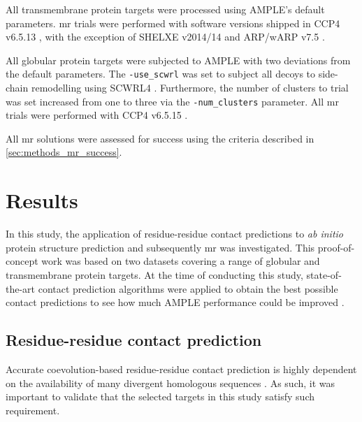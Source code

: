 All transmembrane protein targets were processed using AMPLE's default parameters. \Gls{mr} trials were performed with software versions shipped in CCP4 v6.5.13 \cite{Winn2011-xe}, with the exception of SHELXE v2014/14 \cite{Thorn2013-le} and ARP/wARP v7.5 \cite{Cohen2007-wg}.

All globular protein targets were subjected to AMPLE with two deviations from the default parameters. The \texttt{-use\_scwrl} was set to subject all decoys to side-chain remodelling using SCWRL4 \cite{Krivov2009-ex}. Furthermore, the number of clusters to trial was set increased from one to three via the \texttt{-num\_clusters} parameter. All \gls{mr} trials were performed with CCP4 v6.5.15 \cite{Winn2011-xe}.

All \gls{mr} solutions were assessed for success using the criteria described in \cref{sec:methods_mr_success}.

\section{Results}
In this study, the application of residue-residue contact predictions to \textit{ab initio} protein structure prediction and subsequently \gls{mr} was investigated. This proof-of-concept work was based on two datasets covering a range of globular and transmembrane protein targets. At the time of conducting this study, state-of-the-art contact prediction algorithms were applied to obtain the best possible contact predictions to see how much AMPLE performance could be improved \cite{Bibby2012-lm}.

\subsection{Residue-residue contact prediction} \label{subsec:ample_proof_conpred}
Accurate coevolution-based residue-residue contact prediction is highly dependent on the availability of many divergent homologous sequences \cite{Simkovic2017-xs}. As such, it was important to validate that the selected targets in this study satisfy such requirement.


